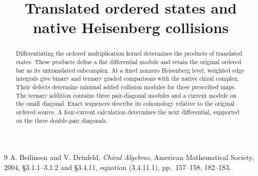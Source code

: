 \documentclass[11pt,oneside]{memoir}
\title{Translated ordered states and native Heisenberg collisions}
\author{}
\date{}
\begin{document}
\maketitle
\begin{abstract}
Differentiating the ordered multiplication kernel determines the products of translated states.
These products define a flat differential module and retain the original ordered bar as its untranslated subcomplex.
At a fixed nonzero Heisenberg level, weighted edge integrals give binary and ternary graded comparisons with the native chiral complex.
Their defects determine minimal added collision modules for these prescribed maps.
The ternary addition contains three pair-diagonal modules and a current module on the small diagonal.
Exact sequences describe its cohomology relative to the original ordered source.
A four-current calculation determines the next differential, supported on the three double-pair diagonals.
\end{abstract}

\begin{thebibliography}{9}
A. Beilinson and V. Drinfeld,
\emph{Chiral Algebras}, American Mathematical Society, 2004,
\S3.1.1--3.1.2 and \S3.4.11, equation (3.4.11.1), pp.~157--158, 182--183.
\end{thebibliography}
\end{document}
